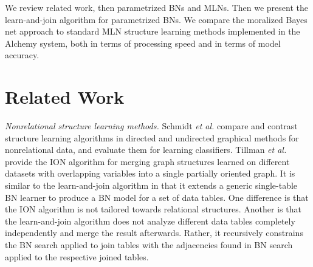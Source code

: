 \documentclass[letterpaper]{article}
\begin{document}
We review related work, then parametrized BNs and MLNs. Then we present the learn-and-join algorithm for parametrized BNs.
We compare the moralized Bayes net approach  to standard MLN structure learning methods implemented in the Alchemy system, both in terms of processing speed and in terms of model accuracy.

\section{Related Work} 

{\em Nonrelational structure learning methods.} Schmidt {\em et al.}  compare and contrast structure learning algorithms in directed and undirected graphical methods for nonrelational data, and evaluate them for learning classifiers.
Tillman {\em et al.}  provide the ION algorithm for merging graph structures learned on different datasets with overlapping variables into a single partially oriented graph. It is similar to the learn-and-join algorithm in that it extends a generic single-table BN learner to produce a BN model for a set of data tables. One difference is that the ION algorithm is not tailored towards relational structures. Another is that the learn-and-join algorithm does not analyze different data tables completely independently and merge the result afterwards. Rather, it recursively constrains the BN search applied to join tables with the adjacencies found in BN search applied to the respective joined tables. 
\end{document}
